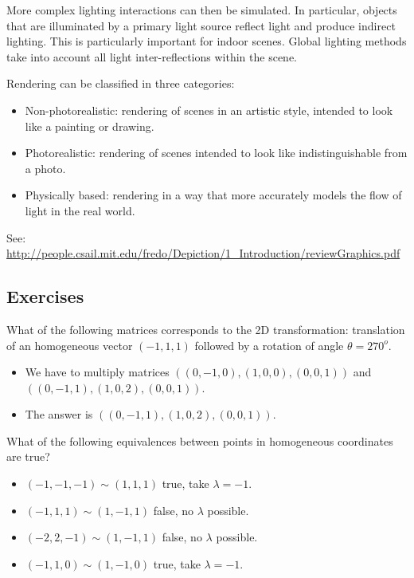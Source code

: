 More complex lighting interactions can then be simulated. In particular, objects that are illuminated by a 
primary light  source  reflect  light  and  produce indirect  lighting.  This  is  particularly  important  for  indoor scenes. Global lighting methods take into account all light inter-reflections within the scene.

Rendering can be classified in three categories:

\begin{itemize}
\item Non-photorealistic: rendering of scenes in an artistic style, intended to look like a painting or drawing.
\item Photorealistic: rendering of scenes intended to look like indistinguishable from a photo.
\item Physically based: rendering in a way that more accurately models the flow of light in the real world. 
\end{itemize}

See: \url{http://people.csail.mit.edu/fredo/Depiction/1_Introduction/reviewGraphics.pdf}

\subsection{Exercises}

\begin{exercise}
What of the following matrices corresponds to the 2D transformation: translation of an homogeneous vector $(-1,1,1)$ followed by a rotation of angle $\theta = 270^{o}$.
\end{exercise}
\begin{itemize}
\item We have to multiply matrices $((0,-1,0),(1,0,0),(0,0,1))$ and $((0,-1,1),(1,0,2),(0,0,1))$.
\item The answer is $((0,-1,1),(1,0,2),(0,0,1))$.
\end{itemize}


\begin{exercise}
What of the following equivalences between points in homogeneous coordinates are true?
\end{exercise}
\begin{itemize}
\item $(-1,-1,-1) \sim (1,1,1)$ true, take $\lambda = -1$.
\item $(-1,1,1) \sim (1,-1,1)$ false, no $\lambda$ possible.
\item $(-2,2,-1) \sim (1,-1,1)$ false, no $\lambda$ possible.
\item $(-1,1,0) \sim (1,-1,0)$ true, take $\lambda = -1$.
\end{itemize}




